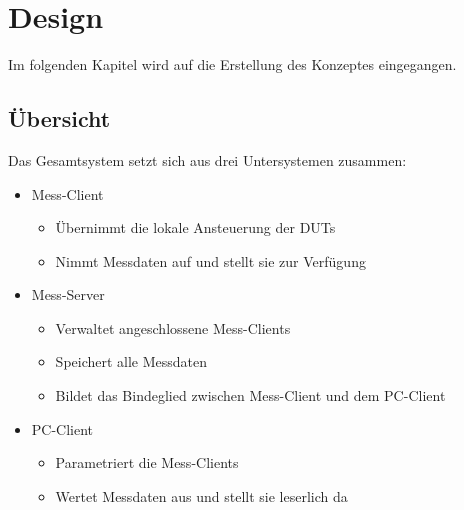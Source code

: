 \chapter{Design}
\label{chapter_Design}

Im folgenden Kapitel wird auf die Erstellung des Konzeptes eingegangen.

\section{Übersicht}
\label{section_Teststand}

Das Gesamtsystem setzt sich aus drei Untersystemen zusammen:

\begin{itemize}

\item Mess-Client
\begin{itemize}
\item Übernimmt die lokale Ansteuerung der \acp{DUT}
\item Nimmt Messdaten auf und stellt sie zur Verfügung
\end{itemize}

\item Mess-Server
\begin{itemize}
\item Verwaltet angeschlossene Mess-Clients
\item Speichert alle Messdaten
\item Bildet das Bindeglied zwischen Mess-Client und dem PC-Client
\end{itemize}

\item PC-Client
\begin{itemize}
\item Parametriert die Mess-Clients
\item Wertet Messdaten aus und stellt sie leserlich da
\end{itemize}

\end{itemize}








\newpage


